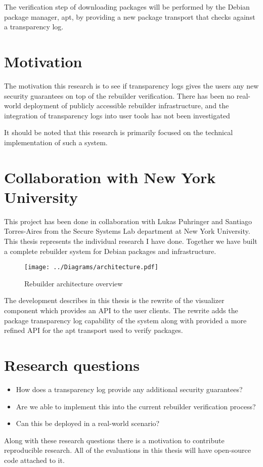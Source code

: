 \documentclass[../Main/thesis.tex]{subfiles}
\begin{document}
The verification step of downloading packages will be performed by the Debian
package manager, apt, by providing a new package transport that checks against a
transparency log.

\section{Motivation}\label{sec:motivation}
The motivation this research is to see if transparency logs gives the users any
new security guarantees on top of the rebuilder verification. There has been no
real-world deployment of publicly accessible rebuilder infrastructure, and the
integration of transparency logs into user tools has not been investigated 

It should be noted that this research is primarily focused on the technical
implementation of such a system.

\section{Collaboration with New York University}\label{sec:collab}
This project has been done in collaboration with Lukas Puhringer and Santiago
Torres-Aires from the Secure Systems Lab department at New York University. This
thesis represents the individual research I have done. Together we have built a
complete rebuilder system for Debian packages and infrastructure. 

\begin{figure}[H]
\centering
\texttt{[image: ../Diagrams/architecture.pdf]}
\caption{Rebuilder architecture overview}
\label{fig:rebuilder_architecture}
\end{figure}

The development describes in this thesis is the rewrite of the visualizer
component which provides an API to the user clients. The rewrite adds the
package transparency log capability of the system along with provided a more
refined API for the apt transport used to verify packages.

\section{Research questions}\label{sec:rq}

\begin{itemize}
    \item How does a transparency log provide any additional security guarantees?
    \item Are we able to implement this into the current rebuilder verification
        process?
    \item Can this be deployed in a real-world scenario?
\end{itemize}

Along with these research questions there is a motivation to contribute
reproducible research. All of the evaluations in this thesis will have
open-source code attached to it.

\blankpage
\end{document}
